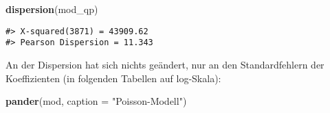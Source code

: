 \documentclass[ngerman,a4paper,]{scrartcl}
\newenvironment{Shaded}{\begin{snugshade}}{\end{snugshade}}
\newcommand{\DataTypeTok}[1]{\textcolor[rgb]{0.13,0.29,0.53}{#1}}
\newcommand{\KeywordTok}[1]{\textcolor[rgb]{0.13,0.29,0.53}{\textbf{#1}}}
\newcommand{\NormalTok}[1]{#1}
\newcommand{\StringTok}[1]{\textcolor[rgb]{0.31,0.60,0.02}{#1}}
\theoremstyle{definition}
\theoremstyle{definition}
\theoremstyle{definition}
\theoremstyle{remark}
\begin{document}
\begin{Shaded}
\begin{Highlighting}[]
\KeywordTok{dispersion}\NormalTok{(mod_qp)}
\end{Highlighting}
\end{Shaded}

\begin{verbatim}
#> X-squared(3871) = 43909.62
#> Pearson Dispersion = 11.343
\end{verbatim}

An der Dispersion hat sich nichts geändert, nur an den Standardfehlern der Koeffizienten (in folgenden Tabellen auf log-Skala):

\begin{Shaded}
\begin{Highlighting}[]
\KeywordTok{pander}\NormalTok{(mod, }\DataTypeTok{caption =} \StringTok{"Poisson-Modell"}\NormalTok{)}
\end{Highlighting}
\end{Shaded}
\end{document}
